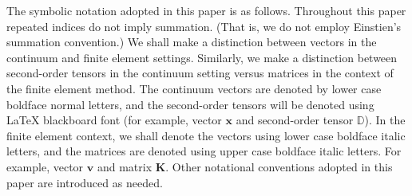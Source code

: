 \documentclass[11pt]{amsart}
\begin{document}
The symbolic notation adopted in this paper is as follows. Throughout this paper repeated 
indices do not imply summation. (That is, we do not employ Einstien's summation convention.) 
We shall make a distinction between vectors in the continuum and finite element settings. 
Similarly, we make a distinction between second-order tensors in the continuum setting 
versus matrices in the context of the finite element method. The continuum vectors are 
denoted by lower case boldface normal letters, and the second-order tensors will be denoted 
using \LaTeX{} blackboard font (for example, vector $\mathbf{x}$ and second-order tensor 
$\mathbb{D}$). In the finite element context, we shall denote the vectors using lower case 
boldface italic letters, and the matrices are denoted using upper case boldface italic 
letters. For example, vector $\boldsymbol{v}$ and matrix $\boldsymbol{K}$. Other notational 
conventions adopted in this paper are introduced as needed. 
 
\end{document}

